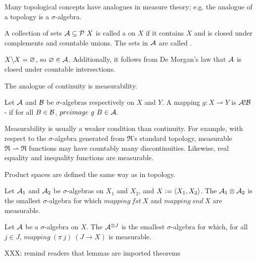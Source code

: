 \documentclass[preprint]{sigplanconf}
\newcommand{\pto}{\rightharpoonup}
\begin{document}
Many topological concepts have analogues in measure theory; e.g. the analogue of a topology is a $\sigma$-algebra.

\begin{definition}
A collection of sets $\mathcal{A} \subseteq \mathcal{P}~X$ is called a  on $X$ if it contains $X$ and is closed under complements and countable unions.
The sets in $\mathcal{A}$ are called .
\end{definition}

$X \backslash X = \varnothing$, so $\varnothing \in \mathcal{A}$.
Additionally, it follows from De Morgan's law that $\mathcal{A}$ is closed under countable intersections.

The analogue of continuity is measurability.

\begin{definition}
Let $\mathcal{A}$ and $\mathcal{B}$ be $\sigma$-algebras respectively on $X$ and $Y$.
A mapping $g : X \pto Y$ is $\mathcal{A}!\mathcal{B}$- if for all $B \in \mathcal{B}$, $preimage~g~B \in \mathcal{A}$.
\end{definition}

Measurability is usually a weaker condition than continuity.
For example, with respect to the $\sigma$-algebra generated from $\Re$'s standard topology, measurable $\Re \pto \Re$ functions may have countably many discontinuities.
Likewise, real equality and inequality functions are measurable.

Product spaces are defined the same way as in topology.

\begin{definition}
Let $\mathcal{A}_1$ and $\mathcal{A}_2$ be $\sigma$-algebras on $X_1$ and $X_2$, and $X := \langle{X_1,X_2}\rangle$.
The  $\mathcal{A}_1 \otimes \mathcal{A}_2$ is the smallest $\sigma$-algebra for which $mapping~fst~X$ and $mapping~snd~X$ are measurable.
\label{def:finite-product-sigma-algebra}
\end{definition}

\begin{definition}
Let $\mathcal{A}$ be a $\sigma$-algebra on $X$.
The  $\mathcal{A}^{\otimes J}$ is the smallest $\sigma$-algebra for which, for all $j \in J$, $mapping~(\pi~j)~(J \to X)$ is measurable.
\label{def:arbitrary-product-sigma-algebra}
\end{definition}

XXX: remind readers that lemmas are imported theorems
\end{document}
